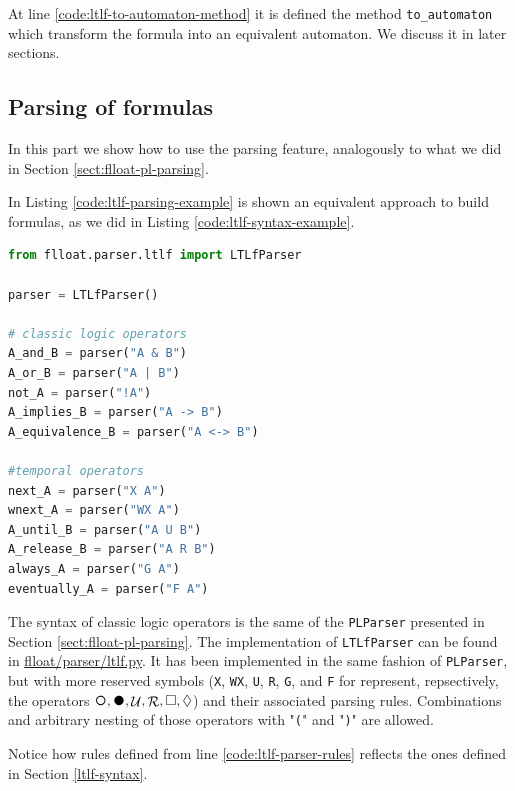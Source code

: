 At line \ref{code:ltlf-to-automaton-method} it is defined the method \texttt{to\_automaton} which transform the \LTLf formula into an equivalent automaton. We discuss it in later sections.
\subsection{Parsing of \LTLf formulas}\label{sect:flloat-ltlf-parsing}
In this part we show how to use the \LTLf parsing feature, analogously to what we did in Section \ref{sect:flloat-pl-parsing}.

In Listing \ref{code:ltlf-parsing-example} is shown an equivalent approach to build \LTLf formulas, as we did in Listing \ref{code:ltlf-syntax-example}.
\begin{lstlisting}[language=Python, style=Python, escapechar = £, label={code:ltlf-parsing-example}, caption={Parsing of \LTLf formulas}]
from flloat.parser.ltlf import LTLfParser

parser = LTLfParser()

# classic logic operators
A_and_B = parser("A & B")
A_or_B = parser("A | B")
not_A = parser("!A")
A_implies_B = parser("A -> B")
A_equivalence_B = parser("A <-> B")

#temporal operators
next_A = parser("X A")
wnext_A = parser("WX A")
A_until_B = parser("A U B")
A_release_B = parser("A R B")
always_A = parser("G A")
eventually_A = parser("F A")
\end{lstlisting}
The syntax of classic logic operators is the same of the \texttt{PLParser} presented in Section \ref{sect:flloat-pl-parsing}. The implementation of \texttt{LTLfParser} can be found in \href{https://github.com/MarcoFavorito/flloat/blob/0.1.4/flloat/parser/ltlf.py}{flloat/parser/ltlf.py}. It has been implemented in the same fashion of \texttt{PLParser}, but with more reserved symbols (\texttt{X}, \texttt{WX}, \texttt{U}, \texttt{R}, \texttt{G}, and \texttt{F} for represent, repsectively, the \LTLf operators $\Next, \Wnext, \lUntil, \Release, \Box, \Diamond$) and their associated parsing rules. Combinations and arbitrary nesting of those operators with "\texttt{(}" and "\texttt{)}" are allowed.

Notice how rules defined from line \ref{code:ltlf-parser-rules} reflects the ones defined in Section \ref{ltlf-syntax}.


